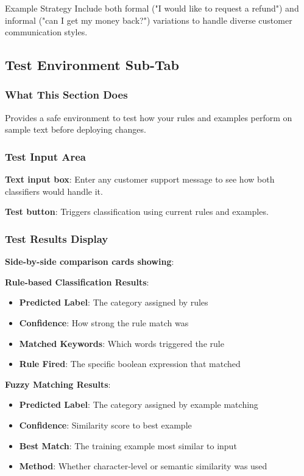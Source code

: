 \documentclass[11pt,a4paper]{article}
\begin{document}
\begin{tipbox}{Example Strategy}
Include both formal ("I would like to request a refund") and informal ("can I get my money back?") variations to handle diverse customer communication styles.
\end{tipbox}

\subsection{Test Environment Sub-Tab}

\subsubsection{What This Section Does}
Provides a safe environment to test how your rules and examples perform on sample text before deploying changes.

\subsubsection{Test Input Area}
\textbf{Text input box}: Enter any customer support message to see how both classifiers would handle it.

\textbf{Test button}: Triggers classification using current rules and examples.

\subsubsection{Test Results Display}
\textbf{Side-by-side comparison cards showing}:

\textbf{Rule-based Classification Results}:
\begin{itemize}
    \item \textbf{Predicted Label}: The category assigned by rules
    \item \textbf{Confidence}: How strong the rule match was
    \item \textbf{Matched Keywords}: Which words triggered the rule
    \item \textbf{Rule Fired}: The specific boolean expression that matched
\end{itemize}

\textbf{Fuzzy Matching Results}:
\begin{itemize}
    \item \textbf{Predicted Label}: The category assigned by example matching
    \item \textbf{Confidence}: Similarity score to best example
    \item \textbf{Best Match}: The training example most similar to input
    \item \textbf{Method}: Whether character-level or semantic similarity was used
\end{itemize}
\end{document}
